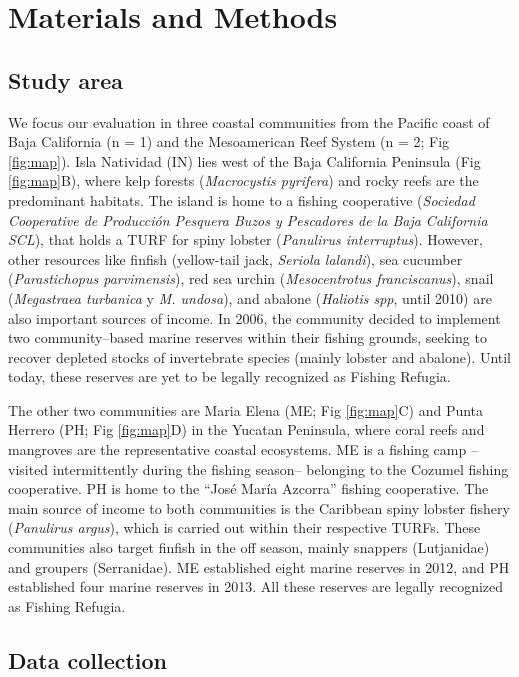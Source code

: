 \documentclass{frontiersSCNS}
\theoremstyle{definition}
\theoremstyle{definition}
\theoremstyle{definition}
\theoremstyle{remark}
\begin{document}
\section{Materials and Methods}\label{materials-and-methods}

\subsection{Study area}\label{study-area}

We focus our evaluation in three coastal communities from the Pacific
coast of Baja California (n = 1) and the Mesoamerican Reef System (n =
2; Fig \ref{fig:map}). Isla Natividad (IN) lies west of the Baja
California Peninsula (Fig \ref{fig:map}B), where kelp forests
(\emph{Macrocystis pyrifera}) and rocky reefs are the predominant
habitats. The island is home to a fishing cooperative (\emph{Sociedad
Cooperative de Producción Pesquera Buzos y Pescadores de la Baja
California SCL}), that holds a TURF for spiny lobster (\emph{Panulirus
interruptus}). However, other resources like finfish (yellow-tail jack,
\emph{Seriola lalandi}), sea cucumber (\emph{Parastichopus
parvimensis}), red sea urchin (\emph{Mesocentrotus franciscanus}), snail
(\emph{Megastraea turbanica} y \emph{M. undosa}), and abalone
(\emph{Haliotis spp}, until 2010) are also important sources of income.
In 2006, the community decided to implement two community--based marine
reserves within their fishing grounds, seeking to recover depleted
stocks of invertebrate species (mainly lobster and abalone). Until
today, these reserves are yet to be legally recognized as Fishing
Refugia.

The other two communities are Maria Elena (ME; Fig \ref{fig:map}C) and
Punta Herrero (PH; Fig \ref{fig:map}D) in the Yucatan Peninsula, where
coral reefs and mangroves are the representative coastal ecosystems. ME
is a fishing camp --visited intermittently during the fishing season--
belonging to the Cozumel fishing cooperative. PH is home to the ``José
María Azcorra'' fishing cooperative. The main source of income to both
communities is the Caribbean spiny lobster fishery (\emph{Panulirus
argus}), which is carried out within their respective TURFs. These
communities also target finfish in the off season, mainly snappers
(Lutjanidae) and groupers (Serranidae). ME established eight marine
reserves in 2012, and PH established four marine reserves in 2013. All
these reserves are legally recognized as Fishing Refugia.

\subsection{Data collection}\label{data-collection}
\end{document}
